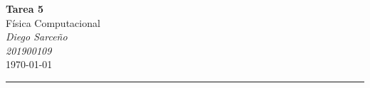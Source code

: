 



%


\textcolor{DS_Black}{
\begin{minipage}{0.85\textwidth}
    \begin{center}
        \textbf{\Large Tarea 5}\\
        \vspace{5pt}
        Física Computacional \\
        \vspace{20pt}
        \textit{Diego Sarceño} \\
        \vspace{5pt}
        \footnotesize{\textit{201900109}} \\
        \vspace{5pt}
        \today
    \end{center}
\end{minipage}
\vspace{10pt}
\hrule
}